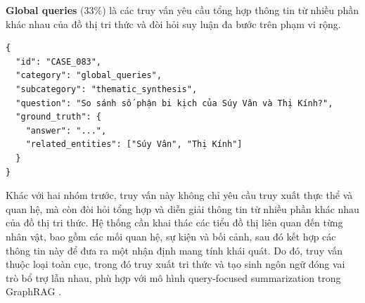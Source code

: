 \textbf{Global queries} (33\%) là các truy vấn yêu cầu tổng hợp thông tin từ nhiều phần khác nhau của đồ thị tri thức và đòi hỏi suy luận đa bước trên phạm vi rộng.

\begin{tcolorbox}[colback=gray!5, colframe=black!50, arc=4pt, boxrule=0.5pt]
{\small
\begin{verbatim}
{
  "id": "CASE_083",
  "category": "global_queries",
  "subcategory": "thematic_synthesis",
  "question": "So sánh số phận bi kịch của Súy Vân và Thị Kính?",
  "ground_truth": {
    "answer": "...",
    "related_entities": ["Súy Vân", "Thị Kính"]
  }
}
\end{verbatim}
}
\end{tcolorbox}

Khác với hai nhóm trước, truy vấn này không chỉ yêu cầu truy xuất thực thể và quan hệ, mà còn đòi hỏi tổng hợp và diễn giải thông tin từ nhiều phần khác nhau của đồ thị tri thức. Hệ thống cần khai thác các tiểu đồ thị liên quan đến từng nhân vật, bao gồm các mối quan hệ, sự kiện và bối cảnh, sau đó kết hợp các thông tin này để đưa ra một nhận định mang tính khái quát. Do đó, truy vấn thuộc loại toàn cục, trong đó truy xuất tri thức và tạo sinh ngôn ngữ đóng vai trò bổ trợ lẫn nhau, phù hợp với mô hình query-focused summarization trong GraphRAG \cite{edge2024graphrag}.
